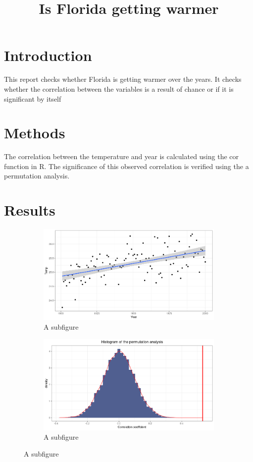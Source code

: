 \documentclass[12pt]{article}
\title{Is Florida getting warmer}
\begin{document}
    \maketitle

    \section{Introduction}
        This report checks whether Florida is getting warmer over the years. It checks whether the correlation between the variables is a result of chance or if it is significant by itself

    \section{Methods}
        The correlation between the temperature and year is calculated using the cor function in R. 
        The significance of this observed correlation is verified using the a permutation analysis. 

    \section{Results}    
    \begin{figure}
        \centering
        \begin{subfigure}{.5\textwidth}
          \centering
          \includegraphics[width=.75\linewidth]{../../week3/data/latex1.png}
          \caption{A subfigure}
          \label{fig:sub1}
        \end{subfigure}%
        \begin{subfigure}{.5\textwidth}
          \centering
          \includegraphics[width=.75\linewidth]{../../week3/data/latex2.png}
          \caption{A subfigure}
          \label{fig:sub2}
        \end{subfigure}
        \label{fig_req}
        \end{figure}
\end{document}
